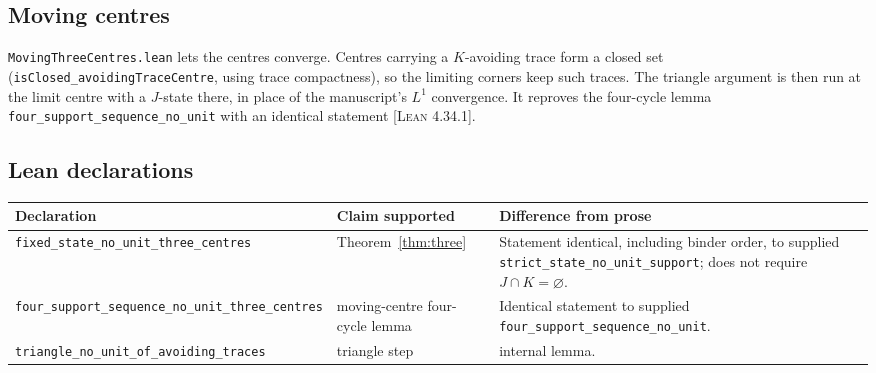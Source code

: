 \documentclass[11pt]{article}
\theoremstyle{definition}
\theoremstyle{remark}
\newcommand{\st}[1]{\textsc{[#1]}}
\begin{document}
\subsection{Moving centres}
\texttt{Moving\allowbreak{}Three\allowbreak{}Centres.\allowbreak{}lean} lets the centres converge. Centres carrying a $K$-avoiding trace form a closed set (\texttt{is\allowbreak{}Closed\_\allowbreak{}avoiding\allowbreak{}Trace\allowbreak{}Centre}, using trace compactness), so the limiting corners keep such traces. The triangle argument is then run at the limit centre with a $J$-state there, in place of the manuscript's $L^1$ convergence. It reproves the four-cycle lemma \texttt{four\_\allowbreak{}support\_\allowbreak{}sequence\_\allowbreak{}no\_\allowbreak{}unit} with an identical statement \st{Lean 4.34.1}.

\subsection{Lean declarations}
\begin{center}\small
\begin{tabularx}{\linewidth}{@{}l X X@{}}
\toprule
Declaration & Claim supported & Difference from prose\\
\midrule
\texttt{fixed\_\allowbreak{}state\_\allowbreak{}no\_\allowbreak{}unit\_\allowbreak{}three\_\allowbreak{}centres} & Theorem~\ref{thm:three} & Statement identical, including binder order, to supplied \texttt{strict\_\allowbreak{}state\_\allowbreak{}no\_\allowbreak{}unit\_\allowbreak{}support}; does not require $J\cap K=\varnothing$.\\
\texttt{four\_\allowbreak{}support\_\allowbreak{}sequence\_\allowbreak{}no\_\allowbreak{}unit\_\allowbreak{}three\_\allowbreak{}centres} & moving-centre four-cycle lemma & Identical statement to supplied \texttt{four\_\allowbreak{}support\_\allowbreak{}sequence\_\allowbreak{}no\_\allowbreak{}unit}.\\
\texttt{triangle\_\allowbreak{}no\_\allowbreak{}unit\_\allowbreak{}of\_\allowbreak{}avoiding\_\allowbreak{}traces} & triangle step & internal lemma.\\
\bottomrule
\end{tabularx}
\end{center}
\end{document}
